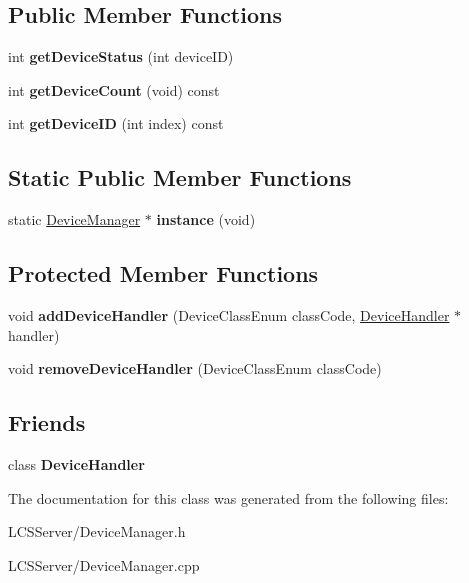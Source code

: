\subsection*{Public Member Functions}
\begin{DoxyCompactItemize}
\item 
\mbox{\label{class_device_manager_af96ef91b388d9f62165268fa6e388e0c}} 
int {\bfseries get\+Device\+Status} (int device\+ID)
\item 
\mbox{\label{class_device_manager_a982b59b42355c617b548d1fb7b766664}} 
int {\bfseries get\+Device\+Count} (void) const
\item 
\mbox{\label{class_device_manager_a1d41fc384c0a2d87192506636440c3d1}} 
int {\bfseries get\+Device\+ID} (int index) const
\end{DoxyCompactItemize}
\subsection*{Static Public Member Functions}
\begin{DoxyCompactItemize}
\item 
\mbox{\label{class_device_manager_acce31b85af330247c7d41f278209b265}} 
static \hyperlink{class_device_manager}{Device\+Manager} $\ast$ {\bfseries instance} (void)
\end{DoxyCompactItemize}
\subsection*{Protected Member Functions}
\begin{DoxyCompactItemize}
\item 
\mbox{\label{class_device_manager_ae1ff953a62461bf8326c73fdb509d50e}} 
void {\bfseries add\+Device\+Handler} (Device\+Class\+Enum class\+Code, \hyperlink{class_device_handler}{Device\+Handler} $\ast$handler)
\item 
\mbox{\label{class_device_manager_a37e887fcdbd35963fbfe00006202807f}} 
void {\bfseries remove\+Device\+Handler} (Device\+Class\+Enum class\+Code)
\end{DoxyCompactItemize}
\subsection*{Friends}
\begin{DoxyCompactItemize}
\item 
\mbox{\label{class_device_manager_a2fd82f6ba5a09bc3061ec8fe2ce5098b}} 
class {\bfseries Device\+Handler}
\end{DoxyCompactItemize}


The documentation for this class was generated from the following files\+:\begin{DoxyCompactItemize}
\item 
L\+C\+S\+Server/Device\+Manager.\+h\item 
L\+C\+S\+Server/Device\+Manager.\+cpp\end{DoxyCompactItemize}
